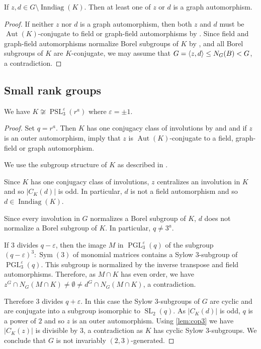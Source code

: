 \documentclass[12pt,a4paper]{amsart}
\DeclareMathOperator{\Aut}{Aut}
\DeclareMathOperator{\Inndiag}{Inndiag}
\DeclareMathOperator{\PGL}{PGL}
\DeclareMathOperator{\PSL}{PSL}
\DeclareMathOperator{\SL}{SL}
\DeclareMathOperator{\Sym}{Sym}
\renewcommand{\epsilon}{\varepsilon}
\newcommand{\eps}{\epsilon}
\DeclarePairedDelimiter{\gen}{\langle}{\rangle}
\begin{document}
 \begin{lemma}\label{not both field or graph field} If $z,d \in G\setminus \Inndiag (K)$. Then at least one of $z$ or $d$ is a graph  automorphism.
 \end{lemma}
 \begin{proof} If neither $z$ nor $d$ is a graph automorphism, then both $z$ and $d$ must be $\Aut(K)$-conjugate to field or graph-field automorphisms by \cite[Propositions 4.9.1]{GLS3}.
 Since field and graph-field automorphisms normalize Borel subgroups of $K$ by \cite[Theorem 2.5.1 c]{GLS3}, and all Borel subgroups of $K$ are $K$-conjugate, we may assume that  $G=\gen{z,d}\le N_G(B)<G$, a contradiction.
 \end{proof}
\subsection{Small rank groups}







\begin{lemma}\label{lem:notpsl3} We have $K\not \cong \PSL_3^\epsilon(r^a)$ where $\epsilon =\pm 1$.
\end{lemma}

\begin{proof} Set $q=r^a$.
 Then $K$ has one conjugacy class of involutions by \cite[Table 4.5.1]{GLS3} and \cite[(4.1) and (6.1)]{AschbacherSeitz} and if $z$ is an outer automorphism,  \cite[Table 4.5.1 and Proposition 4.9.2]{GLS3} imply that $z$ is $\Aut(K)$-conjugate to a   field, graph-field or graph automorphism.

 We use the subgroup structure of $K$ as described in \cite[Theorem 6.5.3]{GLS3}.

Since $K$ has one conjugacy class of involutions, $z $ centralizes an involution in $K$ and so $|C_K(d)|$ is odd.  In particular, $d$ is not a field automorphism and so $d \in \Inndiag(K)$.

Since every involution in $G$ normalizes a Borel subgroup of $K$, $d$ does not normalize a Borel subgroup of $K$. In particular, $q\ne 3^a$.




If $3$ divides $q-\epsilon$, then the image $M$ in $\PGL_3^\eps(q)$ of the subgroup  $(q-\eps)^3:\Sym(3)$ of monomial matrices contains a Sylow $3$-subgroup of $\PGL_3^\eps(q)$. This subgroup is normalized by the inverse transpose and field automorphisms. Therefore, as $M \cap K$ has even order, we have $z^G\cap N_G(M\cap K)\not= \emptyset \not= d^G\cap N_G(M\cap K)$, a contradiction.

Therefore $3$ divides $q+\eps$. In this case the Sylow $3$-subgroups of $G$ are cyclic and are conjugate into a subgroup isomorphic to $\SL_2(q)$. As $|C_K(d)|$ is odd, $q$ is a power of $2$ and so $z$ is an outer automorphism.  Using \cref{lem:cop3} we have $|C_K(z)|$ is divisible by $3$, a contradiction as $K$ has cyclic Sylow $3$-subgroups. We conclude that  $G$ is not invariably $(2,3)$-generated.
\end{proof}
\end{document}
